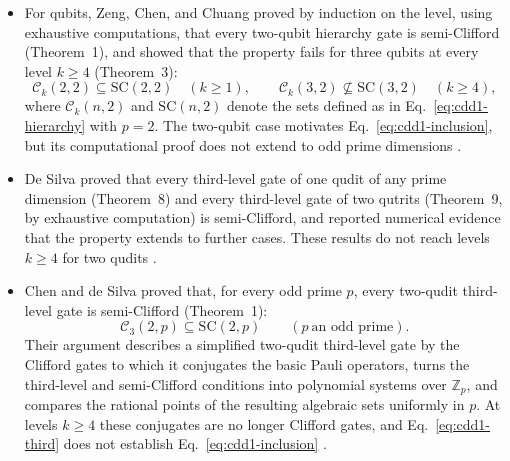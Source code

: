 \begin{itemize}
  \item For qubits, Zeng, Chen, and Chuang proved by induction on the level,
  using exhaustive computations, that every two-qubit hierarchy gate is
  semi-Clifford (Theorem~1), and showed that the property fails for three qubits
  at every level $k\geq4$ (Theorem~3):
  \begin{equation}
    \mathcal{C}_k(2,2)\subseteq\mathrm{SC}(2,2)\quad(k\geq1),
    \qquad
    \mathcal{C}_k(3,2)\not\subseteq\mathrm{SC}(3,2)\quad(k\geq4),
    \label{eq:cdd1-qubits}
  \end{equation}
  where $\mathcal{C}_k(n,2)$ and $\mathrm{SC}(n,2)$ denote the sets defined as in
  Eq.~\eqref{eq:cdd1-hierarchy} with $p=2$.  The two-qubit case motivates
  Eq.~\eqref{eq:cdd1-inclusion}, but its computational proof does not extend to
  odd prime dimensions .

  \item De Silva proved that every third-level gate of one qudit of any prime
  dimension (Theorem~8) and every third-level gate of two qutrits (Theorem~9, by
  exhaustive computation) is semi-Clifford, and reported numerical evidence that
  the property extends to further cases.  These results do not reach levels
  $k\geq4$ for two qudits .

  \item Chen and de Silva proved that, for every odd prime $p$, every two-qudit
  third-level gate is semi-Clifford (Theorem~1):
  \begin{equation}
    \mathcal{C}_3(2,p)\subseteq\mathrm{SC}(2,p)
    \qquad(p\ \text{an odd prime}).
    \label{eq:cdd1-third}
  \end{equation}
  Their argument describes a simplified two-qudit third-level gate by the
  Clifford gates to which it conjugates the basic Pauli operators, turns the
  third-level and semi-Clifford conditions into polynomial systems over
  $\mathbb{Z}_p$, and compares the rational points of the resulting algebraic
  sets uniformly in $p$.  At levels $k\geq4$ these conjugates are no longer
  Clifford gates, and Eq.~\eqref{eq:cdd1-third} does not establish
  Eq.~\eqref{eq:cdd1-inclusion} .


\end{itemize}
